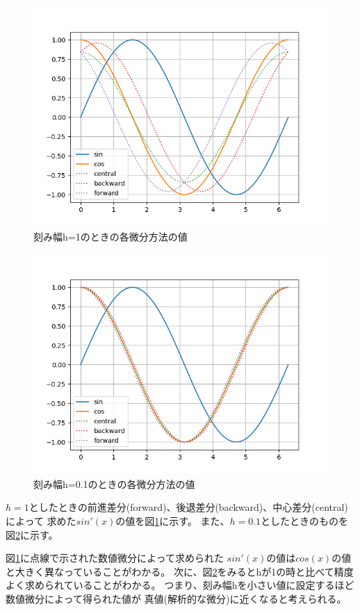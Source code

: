 \documentclass[dvipdfmx]{jsarticle}
\begin{document}
\begin{figure}[H]
  \centering
  \includegraphics[width=0.7\hsize]{../pics/h=1.png}
  \caption{刻み幅h=1のときの各微分方法の値}
  \label{fig:h_1}
\end{figure}

\begin{figure}[H]
  \centering
  \includegraphics[width=0.7\hsize]{../pics/h=0_1.png}
  \caption{刻み幅h=0.1のときの各微分方法の値}
  \label{fig:h_01}
\end{figure}

$h=1$としたときの前進差分(forward)、後退差分(backward)、中心差分(central)によって
求めた$sin'(x)$の値を図\ref{fig:h_1}に示す。
また、$h=0.1$としたときのものを図\ref{fig:h_01}に示す。

図\ref{fig:h_1}に点線で示された数値微分によって求められた
$sin'(x)$の値は$cos(x)$の値と大きく異なっていることがわかる。
次に、図\ref{fig:h_01}をみるとhが1の時と比べて精度よく求められていることがわかる。
つまり、刻み幅hを小さい値に設定するほど数値微分によって得られた値が
真値(解析的な微分)に近くなると考えられる。
\end{document}
